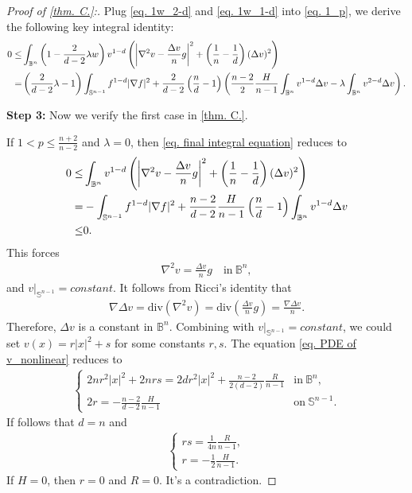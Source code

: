 \documentclass[12pt]{amsart}
\numberwithin{equation}{section}
\numberwithin{lemma}{section}
\numberwithin{proposition}{section}
\numberwithin{corollary}{section}
\numberwithin{remark}{section}
\begin{document}
\begin{proof}[Proof of \cref{thm. C.}:]
    Plug \cref{eq. 1w_2-d} and \cref{eq. 1w_1-d} into \cref{eq. 1_p}, we derive the following key integral identity:
    \begin{align}\label{eq. final integral equation}
    0\leq&\int_{\mathbb{B}^n}
    \left(1-\frac{2}{d-2}\lambda w\right)
    v^{1-d}\left(
        \left|\nabla^2 v-\frac{\Delta v}{n}g\right|^2
        +\left(\frac{1}{n}-\frac{1}{d}\right)(\Delta v)^2
        \right)\notag\\
        =&\left(\frac{2}{d-2}\lambda-1\right)\int_{\mathbb{S}^{n-1}}f^{1-d}|\nabla f|^2
        +\frac{2}{d-2}\left(\frac{n}{d}-1\right)\left(
        \frac{n-2}{2}\frac{H}{n-1}\int_{\mathbb{B}^n}v^{1-d}\Delta v-\lambda \int_{\mathbb{B}^n}v^{2-d}\Delta v
        \right).
\end{align}

\textbf{Step 3:} Now we verify the first case in \cref{thm. C.}.

If $1<p\leq \frac{n+2}{n-2}$ and $\lambda=0$, then \cref{eq. final integral equation} reduces to 
\begin{align*}
    0\leq& \int_{\mathbb{B}^n}v^{1-d}\left(
        \left|\nabla^2 v-\frac{\Delta v}{n}g\right|^2
        +\left(\frac{1}{n}-\frac{1}{d}\right)(\Delta v)^2
        \right)\notag\\
        =&-\int_{\mathbb{S}^{n-1}}f^{1-d}|\nabla f|^2
        +\frac{n-2}{d-2}\frac{H}{n-1}
        \left(\frac{n}{d}-1\right)
        \int_{\mathbb{B}^n}v^{1-d}\Delta v\\
        \leq&0.
\end{align*}
This forces 
\begin{align*}
    \nabla^2v=\frac{\Delta v}{n}g \quad\mathrm{in} \ \mathbb{B}^n,
\end{align*}
and $v|_{\mathbb{S}^{n-1}}=constant$. It follows from Ricci's identity that
\begin{align*}
    \nabla \Delta v
    =\mathrm{div}(\nabla^2v)
    =\mathrm{div}\left(\frac{\Delta v}{n}g\right)
    =\frac{\nabla \Delta v}{n}.
\end{align*}
Therefore, $\Delta v$ is a constant in $\mathbb{B}^n$. Combining with $v|_{\mathbb{S}^{n-1}}=constant$, we could set $v(x)=r|x|^2+s$ for some constants $r,s$. The equation \cref{eq. PDE of v_nonlinear} reduces to
\begin{align*}
    \begin{cases}
        2nr^2|x|^2+2nrs=2dr^2|x|^2+\frac{n-2}{2(d-2)}\frac{R}{n-1} &\mathrm{in}\ \mathbb{B}^n, \\
        2r=-\frac{n-2}{d-2}\frac{H}{n-1} &\mathrm{on}\ \mathbb{S}^{n-1}.
    \end{cases}
\end{align*}
If follows that $d=n$ and 
\begin{align*}
\begin{cases}
    rs=\frac{1}{4n}\frac{R}{n-1},\\
    r=-\frac{1}{2}\frac{H}{n-1}.
\end{cases}
\end{align*}
If $H=0$, then $r=0$ and $R=0$. It's a contradiction.


\end{proof}
\end{document}
